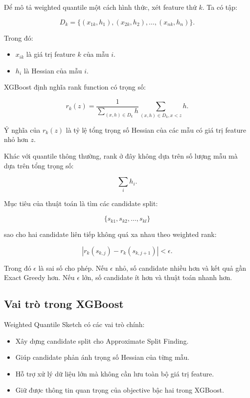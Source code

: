 Để mô tả weighted quantile một cách hình thức, xét feature thứ $k$. Ta có tập:

\[
D_k = \{(x_{1k}, h_1), (x_{2k}, h_2), \ldots, (x_{nk}, h_n)\}.
\]

Trong đó:

\begin{itemize}
    \item $x_{ik}$ là giá trị feature $k$ của mẫu $i$.
    \item $h_i$ là Hessian của mẫu $i$.
\end{itemize}

XGBoost định nghĩa rank function có trọng số:

\[
r_k(z)
=
\frac{1}{\sum_{(x,h)\in D_k} h}
\sum_{(x,h)\in D_k, x < z} h.
\]

Ý nghĩa của $r_k(z)$ là tỷ lệ tổng trọng số Hessian của các mẫu có giá trị feature nhỏ hơn $z$.

Khác với quantile thông thường, rank ở đây không dựa trên số lượng mẫu mà dựa trên tổng trọng số:

\[
\sum_i h_i.
\]

Mục tiêu của thuật toán là tìm các candidate split:

\[
\{s_{k1}, s_{k2}, \ldots, s_{kl}\}
\]

sao cho hai candidate liên tiếp không quá xa nhau theo weighted rank:

\[
|r_k(s_{k,j}) - r_k(s_{k,j+1})| < \epsilon.
\]

Trong đó $\epsilon$ là sai số cho phép. Nếu $\epsilon$ nhỏ, số candidate nhiều hơn và kết quả gần Exact Greedy hơn. Nếu $\epsilon$ lớn, số candidate ít hơn và thuật toán nhanh hơn.

\subsection{Vai trò trong XGBoost}

Weighted Quantile Sketch có các vai trò chính:

\begin{itemize}
    \item Xây dựng candidate split cho Approximate Split Finding.
    \item Giúp candidate phản ánh trọng số Hessian của từng mẫu.
    \item Hỗ trợ xử lý dữ liệu lớn mà không cần lưu toàn bộ giá trị feature.
    \item Giữ được thông tin quan trọng của objective bậc hai trong XGBoost.
\end{itemize}

